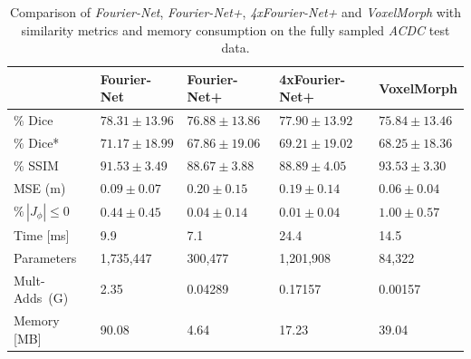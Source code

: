 \begin{table}[h] %
	\centering
	\caption{Comparison of \emph{Fourier-Net}, \emph{Fourier-Net+}, \emph{4xFourier-Net+} and \emph{VoxelMorph} with similarity metrics and memory consumption on the fully sampled \emph{ACDC} test data.}
	\label{tab:CompareVoxelMorph}
	
	\begin{tabularx}{\textwidth}{Y Y Y Y Y} 
		\toprule
		 & Fourier-Net & Fourier-Net+ & \mbox{4xFourier-Net+} & VoxelMorph \\		
		\midrule
		$\%$ Dice & $78.31 \pm 13.96$ & $76.88 \pm 13.86$ & $77.90 \pm 13.92$ & $75.84 \pm 13.46$ \\
		$\%$ Dice* & $71.17 \pm 18.99$ & $67.86 \pm 19.06$ & $69.21 \pm 19.02$ & $68.25 \pm 18.36$ \\
		$\%$ SSIM & $91.53 \pm 3.49$ & $88.67 \pm 3.88$ & $88.89 \pm 4.05$ & $93.53 \pm 3.30$ \\
		MSE (m) & $0.09 \pm 0.07$ & $0.20 \pm 0.15$ & $0.19 \pm 0.14$ & $0.06 \pm 0.04$ \\
		$\% \, |J_{\phi}|\leq0$ & $0.44 \pm 0.45$ & $0.04 \pm 0.14$ & $0.01 \pm 0.04$ & $1.00 \pm 0.57$ \\
		Time [ms] 	  & 9.9    & 7.1 	& 24.4  	& 14.5 \\
		Parameters 	  & 1,735,447 & 300,477 	& 1,201,908 	& 84,322 \\
		\mbox{Mult-Adds (G)} & 2.35      & 0.04289  & 0.17157  	& 0.00157 \\
		Memory [MB] 	  & 90.08     & 4.64   	& 17.23    	& 39.04 \\
		\bottomrule
	\end{tabularx}	
\end{table}


